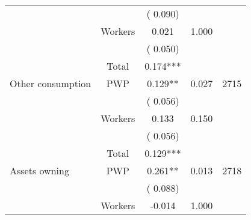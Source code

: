 \begin{tabular}{l*{4}{c}}
                               &                               &       (       0.090)                              & &                                                                             \\ 
                               &       Workers         &              0.021                 &        1.000    &                                               \\ 
                               &                               &       (       0.050)                              & &                                                                             \\ 
\cmidrule{2-3}
                               &       Total           &              0.174***                 &    &                                               \\ 
\cmidrule{2-3}
 Other consumption                 &       PWP     &              0.129**                 &        0.027    & 2715                               \\ 
                               &                               &       (       0.056)                              & &                                                                             \\ 
                               &       Workers         &              0.133                 &        0.150    &                                               \\ 
                               &                               &       (       0.056)                              & &                                                                             \\ 
\cmidrule{2-3}
                               &       Total           &              0.129***                 &    &                                               \\ 
\cmidrule{2-3}
 Assets owning                 &       PWP     &              0.261**                 &        0.013    & 2718                               \\ 
                               &                               &       (       0.088)                              & &                                                                             \\ 
                               &       Workers         &             -0.014               &        1.000   &                                               \\ 

\end{tabular}
